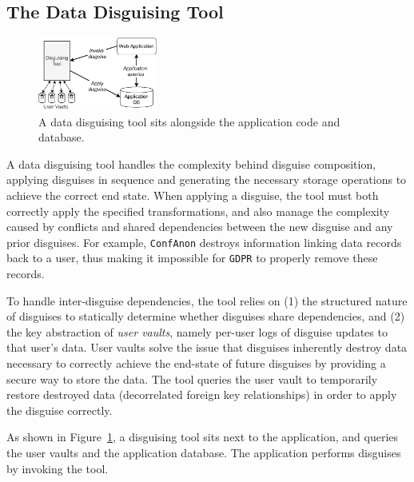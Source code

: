\subsection{The Data Disguising Tool}
\label{sec:composition}
\begin{figure}[t!]
    \centering
    \includegraphics[width=0.35\textwidth]{img/disguise_tool}

    \caption{A data disguising tool sits alongside the application code and database.}
    \label{fig:tool}
\end{figure}


A data disguising tool handles the complexity behind disguise composition, applying disguises in
sequence and generating the necessary storage operations to achieve the correct end state.
When applying a disguise, the tool must both correctly apply the specified transformations, and also
manage the complexity caused by conflicts and shared dependencies between the new disguise and any
prior disguises.  For example, \texttt{ConfAnon} destroys information linking data records back to a
user, thus making it impossible for \texttt{GDPR} to properly remove these records.

To handle inter-disguise dependencies, the tool relies on (1) the structured nature of disguises to
statically determine whether disguises share dependencies, and (2) the key abstraction of \emph{user
vaults}, namely per-user logs of disguise updates to that user's data.  User vaults solve the issue
that disguises inherently destroy data necessary to correctly achieve the end-state of future
disguises by providing a secure way to store the data. The tool queries the user vault to
temporarily restore destroyed data (\eg decorrelated foreign key relationships) in order to apply
the disguise correctly.

As shown in Figure~\ref{fig:tool}, a disguising tool sits next to the application, and queries the
user vaults and the application database. The application performs disguises by invoking the tool.

